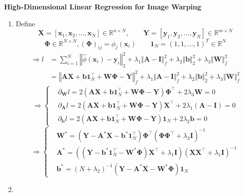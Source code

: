 \documentclass[11pt,letter,notitlepage]{article}
\begin{document}
\begin{solution} \textbf{High-Dimensional Linear Regression for Image Warping}
\begin{enumerate}
	\item
	Define
	\[
	\mathbf{X}
	=
	[\mathbf{x}_1, \mathbf{x}_2, \dots, \mathbf{x}_N] \in \mathbb{R}^{n \times N},
	\qquad
	\mathbf{Y} = [\mathbf{y}_1, \mathbf{y}_2, \dots, \mathbf{y}_N] \in \mathbb{R}^{m \times N}
	\]
	\[
	\mathbf{\Phi} \in \mathbb{R}^{N \times N}, (\mathbf{\Phi})_{ij} = \phi_j(\mathbf{x}_i)
	\qquad
	\mathbf{1}_N = (1,1,\dots,1)^T \in \mathbb{R}^N
	\]
	\begin{align*}
	\Longrightarrow
	l
	&=
	\sum_{i = 1}^N\left\Vert \hat{\phi}(\mathbf{x}_i) - \mathbf{y}_i \right\Vert _2^2 + \lambda_1\Vert \mathbf{A} - \mathbf{I}\Vert_f^2 + \lambda_2 \Vert\mathbf{b} \Vert _2^2 + \lambda_3\Vert \mathbf{W}\Vert_f^2\\
	&=
	\left\Vert \mathbf{A}\mathbf{X} + \mathbf{b}\mathbf{1}_N^\top + \mathbf{W} \mathbf{\Phi} - \mathbf{Y} \right\Vert _f^2
	+
	\lambda_1\Vert \mathbf{A} - \mathbf{I}\Vert_f^2
	+
	\lambda_2 \Vert\mathbf{b} \Vert _2^2
	+
	\lambda_3\Vert \mathbf{W}\Vert_f^2
	\end{align*}
	\begin{equation}
	\nonumber
	\Longrightarrow
	\left\{
	\begin{aligned}
	&\partial_\mathbf{W} l
	=
	2\left(\mathbf{A}\mathbf{X} + \mathbf{b}\mathbf{1}_N^\top + \mathbf{W} \mathbf{\Phi} - \mathbf{Y}\right) \mathbf{\Phi}^\top + 2\lambda_3 \mathbf{W}
	=
	0\\
	&\partial_\mathbf{A} l
	=
	2\left(\mathbf{A}\mathbf{X} + \mathbf{b}\mathbf{1}_N^\top + \mathbf{W} \mathbf{\Phi} - \mathbf{Y}\right) \mathbf{X}^\top + 2\lambda_1 (\mathbf{A} - \mathbf{I})
	=
	0\\
	&\partial_\mathbf{b} l
	=
	2\left(\mathbf{A}\mathbf{X} + \mathbf{b}\mathbf{1}_N^\top + \mathbf{W} \mathbf{\Phi} - \mathbf{Y}\right) \mathbf{1}_N + 2\lambda_2 \mathbf{b}
	=
	0
	\end{aligned}
	\right.
	\end{equation}
	\begin{equation}
	\nonumber
	\Longrightarrow
	\left\{
	\begin{aligned}
	&\mathbf{W}^*
	=
	\left(\mathbf{Y} - \mathbf{A}^*\mathbf{X} - \mathbf{b}^*\mathbf{1}_N^\top\right) \mathbf{\Phi}^\top
	\left(\mathbf{\Phi} \mathbf{\Phi}^\top + \lambda_3 \mathbf{I}\right)^{-1}\\
	&\mathbf{A}^*
	=
	\left(\left(\mathbf{Y} - \mathbf{b}^* \mathbf{1}_N^\top - \mathbf{W}^* \mathbf{\Phi}\right) \mathbf{X}^\top + \lambda_1 \mathbf{I}\right) \left(\mathbf{X} \mathbf{X}^\top + \lambda_1 \mathbf{I}\right)^{-1}\\
	&\mathbf{b}^*
	=
	\left(N + \lambda_2\right)^{-1} \left(\mathbf{Y} - \mathbf{A}^* \mathbf{X} - \mathbf{W}^* \mathbf{\Phi}\right) \mathbf{1}_N
	\end{aligned}
	\right.
	\end{equation}
	\item 	
\end{enumerate}
\end{solution}
    
\end{document}
